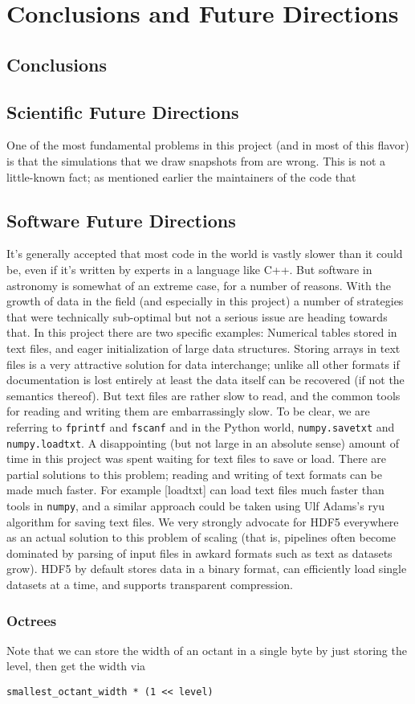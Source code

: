 \chapter{Conclusions and Future Directions}
\label{sec:discussion}

\section{Conclusions}
\label{sec:conclusions}


\section{Scientific Future Directions}

One of the most fundamental problems in this project (and in most of this flavor) is that the simulations that we draw snapshots from are wrong.
This is not a little-known fact; as mentioned earlier the maintainers of the code that 

\section{Software Future Directions}

It's generally accepted that most code in the world is vastly slower than it could be, even if it's written by experts in a language like C++.
But software in astronomy is somewhat of an extreme case, for a number of reasons.
With the growth of data in the field (and especially in this project) a number of strategies that were technically sub-optimal but not a serious issue are heading towards that.
In this project there are two specific examples: Numerical tables stored in text files, and eager initialization of large data structures.
Storing arrays in text files is a very attractive solution for data interchange; unlike all other formats if documentation is lost entirely at least the data itself can be recovered (if not the semantics thereof).
But text files are rather slow to read, and the common tools for reading and writing them are embarrassingly slow. To be clear, we are referring to \lstinline{fprintf} and \lstinline{fscanf} and in the Python world, \lstinline{numpy.savetxt} and \lstinline{numpy.loadtxt}.
A disappointing (but not large in an absolute sense) amount of time in this project was spent waiting for text files to save or load.
There are partial solutions to this problem; reading and writing of text formats can be made much faster.
For example \href{https://github.com/saethlin/loadtxt}[loadtxt] can load text files much faster than tools in \lstinline{numpy}, and a similar approach could be taken using Ulf Adams's ryu algorithm for saving text files.
We very strongly advocate for HDF5 everywhere as an actual solution to this problem of scaling (that is, pipelines often become dominated by parsing of input files in awkard formats such as text as datasets grow).
HDF5 by default stores data in a binary format, can efficiently load single datasets at a time, and supports transparent compression.


\subsection{Octrees}

Note that we can store the width of an octant in a single byte by just storing the level, then get the width via
\begin{lstlisting}
smallest_octant_width * (1 << level)
\end{lstlisting}

